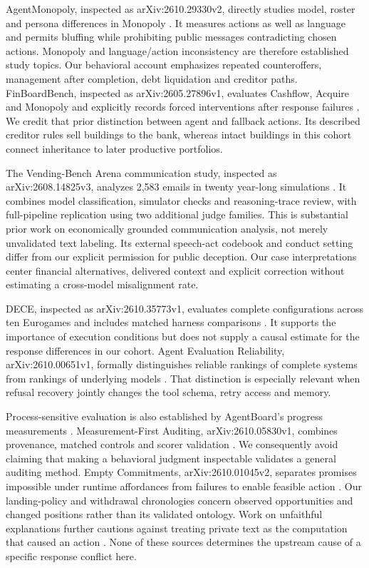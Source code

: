AgentMonopoly, inspected as arXiv:2610.29330v2, directly studies model, roster and persona differences in Monopoly \citep{wu2026agentmonopoly}. It measures actions as well as language and permits bluffing while prohibiting public messages contradicting chosen actions. Monopoly and language/action inconsistency are therefore established study topics. Our behavioral account emphasizes repeated counteroffers, management after completion, debt liquidation and creditor paths. FinBoardBench, inspected as arXiv:2605.27896v1, evaluates Cashflow, Acquire and Monopoly and explicitly records forced interventions after response failures \citep{hu2026finboardbench}. We credit that prior distinction between agent and fallback actions. Its described creditor rules sell buildings to the bank, whereas intact buildings in this cohort connect inheritance to later productive portfolios.

The Vending-Bench Arena communication study, inspected as arXiv:2608.14825v3, analyzes 2,583 emails in twenty year-long simulations \citep{li2026arena}. It combines model classification, simulator checks and reasoning-trace review, with full-pipeline replication using two additional judge families. This is substantial prior work on economically grounded communication analysis, not merely unvalidated text labeling. Its external speech-act codebook and conduct setting differ from our explicit permission for public deception. Our case interpretations center financial alternatives, delivered context and explicit correction without estimating a cross-model misalignment rate.

DECE, inspected as arXiv:2610.35773v1, evaluates complete configurations across ten Eurogames and includes matched harness comparisons \citep{zhang2026dece}. It supports the importance of execution conditions but does not supply a causal estimate for the response differences in our cohort. Agent Evaluation Reliability, arXiv:2610.00651v1, formally distinguishes reliable rankings of complete systems from rankings of underlying models \citep{hardy2026reliability}. That distinction is especially relevant when refusal recovery jointly changes the tool schema, retry access and memory.

Process-sensitive evaluation is also established by AgentBoard's progress measurements \citep{ma2024agentboard}. Measurement-First Auditing, arXiv:2610.05830v1, combines provenance, matched controls and scorer validation \citep{yang2026measurement}. We consequently avoid claiming that making a behavioral judgment inspectable validates a general auditing method. Empty Commitments, arXiv:2610.01045v2, separates promises impossible under runtime affordances from failures to enable feasible action \citep{empty_commitments_v2}. Our landing-policy and withdrawal chronologies concern observed opportunities and changed positions rather than its validated ontology. Work on unfaithful explanations further cautions against treating private text as the computation that caused an action \citep{turpin2023unfaithful}. None of these sources determines the upstream cause of a specific response conflict here.

